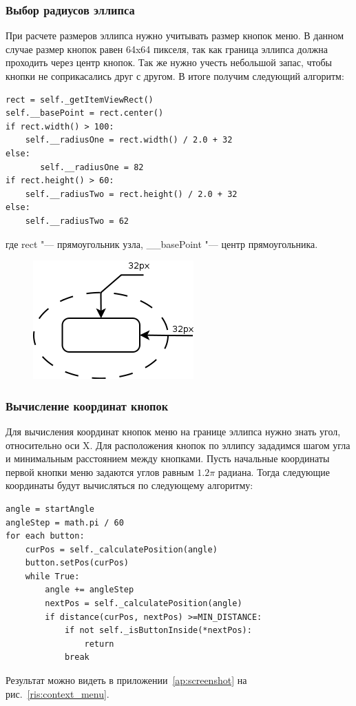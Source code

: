 \subsubsection*{Выбор радиусов эллипса}

При расчете размеров эллипса нужно учитывать размер кнопок меню. В данном случае размер кнопок равен 64x64 пикселя, так как граница эллипса должна проходить через центр кнопок. Так же нужно учесть небольшой запас, чтобы кнопки не соприкасались друг с другом. В итоге получим следующий алгоритм:
\begin{lstlisting}
rect = self._getItemViewRect()
self.__basePoint = rect.center()
if rect.width() > 100:
	self.__radiusOne = rect.width() / 2.0 + 32
else:
       self.__radiusOne = 82
if rect.height() > 60:
	self.__radiusTwo = rect.height() / 2.0 + 32
else:
	self.__radiusTwo = 62 
\end{lstlisting}
где rect "--- прямоугольник узла, \_\_basePoint "--- центр прямоугольника.
\begin{figure}[h!]
\centering
\includegraphics[width=0.3\linewidth]{menu/ellipse}
\end{figure}

\subsubsection*{Вычисление координат кнопок}
Для вычисления координат кнопок меню на границе эллипса нужно знать угол, относительно оси X. 
Для расположения кнопок по эллипсу зададимся шагом угла и минимальным расстоянием между кнопками.
Пусть начальные координаты первой кнопки меню задаются углов равным $1.2\pi$ радиана.
Тогда следующие координаты будут вычисляться по следующему алгоритму:
\begin{lstlisting}
angle = startAngle
angleStep = math.pi / 60
for each button:
	curPos = self._calculatePosition(angle)
	button.setPos(curPos)
	while True:
		angle += angleStep
		nextPos = self._calculatePosition(angle)
		if distance(curPos, nextPos) >=MIN_DISTANCE:
			if not self._isButtonInside(*nextPos):
				return
			break
\end{lstlisting}

Результат можно видеть в приложении~\ref{ap:screenshot} на рис.~\ref{ris:context_menu}.

